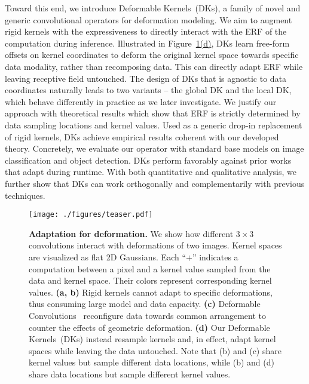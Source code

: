\documentclass{article} \usepackage{iclr2020_conference, times}
\newcommand{\captiont}[2]{\caption{\textbf{#1} #2}}
\begin{document}
Toward this end, we introduce Deformable Kernels~(DKs), a family of novel and generic
convolutional operators for deformation modeling.
We aim to augment rigid kernels with the expressiveness to directly interact
with the ERF of the computation during inference.
Illustrated in Figure~\hyperref[fig:teaser]{1(d)}, DKs learn free-form offsets
on kernel coordinates to deform the original kernel space towards specific data
modality, rather than recomposing data.
This can directly adapt ERF while leaving receptive field untouched.
The design of DKs that is agnostic to data coordinates naturally
leads to two variants -- the global DK and the local DK, which behave
differently in practice as we later investigate.
We justify our approach with
theoretical results which show that ERF is strictly determined by data sampling locations and
kernel values.
Used as a generic drop-in replacement of rigid kernels, DKs achieve empirical
results coherent with our developed theory.
Concretely, we evaluate our operator with standard base models on
image classification and object detection.
DKs perform favorably against prior works that adapt during runtime.
With both quantitative and qualitative analysis, we further show that DKs can
work orthogonally and complementarily with previous techniques.


\begin{figure}[t]
    \centering
    \texttt{[image: ./figures/teaser.pdf]}
    \captiont{Adaptation for deformation.}{
        We show how different $3\times3$ convolutions interact with deformations of two images.
        Kernel spaces are visualized as flat 2D Gaussians.
        Each ``$+$'' indicates a computation between a pixel and a kernel value
        sampled from the data and kernel space.
        Their colors represent corresponding kernel values.
        \textbf{(a, b)} Rigid kernels cannot adapt to specific deformations,
        thus consuming large model and data capacity.
        \textbf{(c)} Deformable Convolutions~\citep{dai2017deformable} reconfigure
        data towards common arrangement to counter the effects of geometric deformation.
        \textbf{(d)} Our Deformable Kernels~(DKs) instead resample kernels and,
        in effect, adapt kernel spaces while leaving the data untouched.
        Note that (b) and (c) share kernel values but sample different data
        locations, while (b) and (d) share data locations but sample different kernel values.
    }
    \vspace{-0.5em}
    \label{fig:teaser}
\end{figure}
\end{document}
